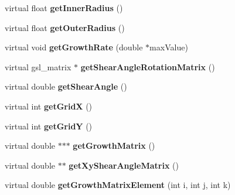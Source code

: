 \begin{DoxyCompactItemize}
\item 
\hypertarget{classGrowthFunctionBase_a05ace7e6cb21566ad03e72e56962d58b}{}virtual float {\bfseries get\+Inner\+Radius} ()\label{classGrowthFunctionBase_a05ace7e6cb21566ad03e72e56962d58b}

\item 
\hypertarget{classGrowthFunctionBase_a2ba8f7659e1c0546998671458943233d}{}virtual float {\bfseries get\+Outer\+Radius} ()\label{classGrowthFunctionBase_a2ba8f7659e1c0546998671458943233d}

\item 
\hypertarget{classGrowthFunctionBase_a9598654cae114f6b443167898ac4d095}{}virtual void {\bfseries get\+Growth\+Rate} (double $\ast$max\+Value)\label{classGrowthFunctionBase_a9598654cae114f6b443167898ac4d095}

\item 
\hypertarget{classGrowthFunctionBase_a3c0d71849d020d29832b1aaaba87065e}{}virtual gsl\+\_\+matrix $\ast$ {\bfseries get\+Shear\+Angle\+Rotation\+Matrix} ()\label{classGrowthFunctionBase_a3c0d71849d020d29832b1aaaba87065e}

\item 
\hypertarget{classGrowthFunctionBase_adea116613ddb2edb7ebc0734d17c9226}{}virtual double {\bfseries get\+Shear\+Angle} ()\label{classGrowthFunctionBase_adea116613ddb2edb7ebc0734d17c9226}

\item 
\hypertarget{classGrowthFunctionBase_a1dfd024db9bf627777741c68f7b5ddf2}{}virtual int {\bfseries get\+Grid\+X} ()\label{classGrowthFunctionBase_a1dfd024db9bf627777741c68f7b5ddf2}

\item 
\hypertarget{classGrowthFunctionBase_a1445bfc812abb72fd6757859aa302feb}{}virtual int {\bfseries get\+Grid\+Y} ()\label{classGrowthFunctionBase_a1445bfc812abb72fd6757859aa302feb}

\item 
\hypertarget{classGrowthFunctionBase_a067bdcd836e7196ce5cfc9120b9499c1}{}virtual double $\ast$$\ast$$\ast$ {\bfseries get\+Growth\+Matrix} ()\label{classGrowthFunctionBase_a067bdcd836e7196ce5cfc9120b9499c1}

\item 
\hypertarget{classGrowthFunctionBase_a32e0a776bc81147dc648662440d50b0d}{}virtual double $\ast$$\ast$ {\bfseries get\+Xy\+Shear\+Angle\+Matrix} ()\label{classGrowthFunctionBase_a32e0a776bc81147dc648662440d50b0d}

\item 
\hypertarget{classGrowthFunctionBase_a4e40d019aff99e72b1aee79d93c8e9a0}{}virtual double {\bfseries get\+Growth\+Matrix\+Element} (int i, int j, int k)\label{classGrowthFunctionBase_a4e40d019aff99e72b1aee79d93c8e9a0}


\end{DoxyCompactItemize}
